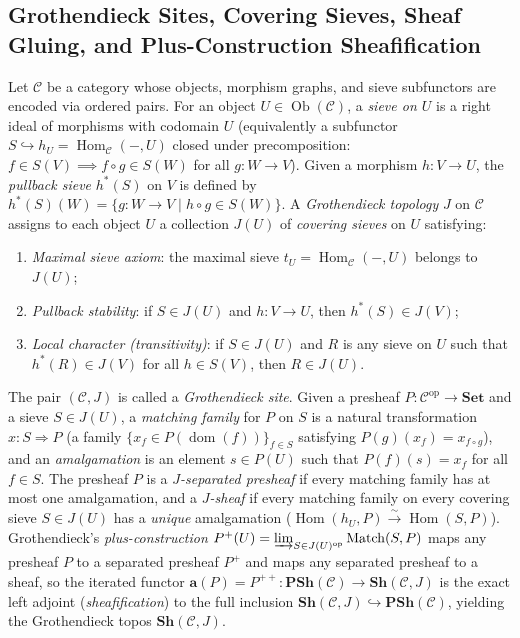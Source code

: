 \subsection{Grothendieck Sites, Covering Sieves, Sheaf Gluing, and Plus-Construction Sheafification}
\label{subsec:grothendieck_sites_sieves_sheaf_gluing_sheafification}

Let $\mathcal{C}$ be a category whose objects, morphism graphs, and sieve subfunctors are encoded via ordered pairs. For an object $U \in \operatorname{Ob}(\mathcal{C})$, a \emph{sieve on $U$} is a right ideal of morphisms with codomain $U$ (equivalently a subfunctor $S \hookrightarrow h_U = \operatorname{Hom}_{\mathcal{C}}(-, U)$ closed under precomposition: $f \in S(V) \implies f \circ g \in S(W)$ for all $g\colon W \to V$). Given a morphism $h\colon V \to U$, the \emph{pullback sieve} $h^*(S)$ on $V$ is defined by $h^*(S)(W) = \{g\colon W \to V \mid h \circ g \in S(W)\}$. A \emph{Grothendieck topology} $J$ on $\mathcal{C}$ assigns to each object $U$ a collection $J(U)$ of \emph{covering sieves} on $U$ satisfying:
\begin{enumerate}
\item \emph{Maximal sieve axiom}: the maximal sieve $t_U = \operatorname{Hom}_{\mathcal{C}}(-, U)$ belongs to $J(U)$;
\item \emph{Pullback stability}: if $S \in J(U)$ and $h\colon V \to U$, then $h^*(S) \in J(V)$;
\item \emph{Local character (transitivity)}: if $S \in J(U)$ and $R$ is any sieve on $U$ such that $h^*(R) \in J(V)$ for all $h \in S(V)$, then $R \in J(U)$.
\end{enumerate}
The pair $(\mathcal{C}, J)$ is called a \emph{Grothendieck site}. Given a presheaf $P\colon \mathcal{C}^{\mathrm{op}} \to \mathbf{Set}$ and a sieve $S \in J(U)$, a \emph{matching family} for $P$ on $S$ is a natural transformation $x\colon S \Rightarrow P$ (a family $\{x_f \in P(\operatorname{dom}(f))\}_{f \in S}$ satisfying $P(g)(x_f) = x_{f \circ g}$), and an \emph{amalgamation} is an element $s \in P(U)$ such that $P(f)(s) = x_f$ for all $f \in S$. The presheaf $P$ is a \emph{$J$-separated presheaf} if every matching family has at most one amalgamation, and a \emph{$J$-sheaf} if every matching family on every covering sieve $S \in J(U)$ has a \emph{unique} amalgamation ($\operatorname{Hom}(h_U, P) \xrightarrow{\sim} \operatorname{Hom}(S, P)$). Grothendieck's \emph{plus-construction} $P^+(U) = \varinjlim_{S \in J(U)^{\mathrm{op}}} \operatorname{Match}(S, P)$ maps any presheaf $P$ to a separated presheaf $P^+$ and maps any separated presheaf to a sheaf, so the iterated functor $\mathbf{a}(P) = P^{++}\colon \mathbf{PSh}(\mathcal{C}) \to \mathbf{Sh}(\mathcal{C}, J)$ is the exact left adjoint (\emph{sheafification}) to the full inclusion $\mathbf{Sh}(\mathcal{C}, J) \hookrightarrow \mathbf{PSh}(\mathcal{C})$, yielding the Grothendieck topos $\mathbf{Sh}(\mathcal{C}, J)$.

